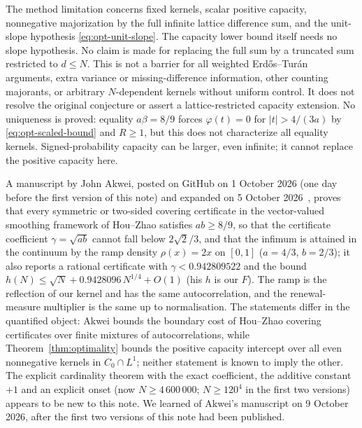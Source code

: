 \documentclass[10pt]{article}
\makeatletter
\numberwithin{equation}{section}
\theoremstyle{remark}
\renewcommand\subsection{\@startsection{subsection}{2}{\z@}{-2.2ex \@plus -.6ex \@minus -.2ex}{1ex \@plus .2ex}{\normalfont\normalsize\bfseries}}
\makeatother
\begin{document}
The method limitation concerns fixed kernels, scalar positive capacity,
nonnegative majorization by the full infinite lattice difference sum,
and the unit-slope hypothesis \eqref{eq:opt-unit-slope}. The capacity lower bound itself
needs no slope hypothesis. No claim is made for replacing the full sum
by a truncated sum restricted to $d\le N$. This is not a barrier for
all weighted Erd\H{o}s--Tur\'an arguments, extra variance or missing-difference
information, other counting majorants, or arbitrary $N$-dependent
kernels without uniform control. It does not resolve the original
conjecture or assert a lattice-restricted capacity extension.
No uniqueness is proved: equality $a\beta=8/9$ forces
$\varphi(t)=0$ for $|t|>4/(3a)$ by \eqref{eq:opt-scaled-bound}
and $R\ge1$, but this does not characterize all equality kernels.
Signed-probability capacity can be larger, even infinite; it cannot
replace the positive capacity here.

\subsection{Independent work on the same constant}\label{sec:akwei}
A manuscript by John Akwei, posted on GitHub on 1 October 2026 (one day
before the first version of this note) and expanded on 5 October
2026~\cite{Akw26a,Akw26b}, proves that every symmetric or two-sided
covering certificate in the vector-valued smoothing framework of
Hou--Zhao satisfies $ab\ge 8/9$, so that the certificate coefficient
$\gamma=\sqrt{ab}$ cannot fall below $2\sqrt2/3$, and that the infimum is
attained in the continuum by the ramp density $\rho(x)=2x$ on $[0,1]$
($a=4/3$, $b=2/3$); it also reports a rational certificate with
$\gamma<0.942809522$ and the bound $h(N)\le\sqrt N+0.9428096\,N^{1/4}+O(1)$
(his $h$ is our $F$).
The ramp is the reflection of our kernel and has the same
autocorrelation, and the renewal-measure multiplier is the same up to
normalisation. The statements differ in the quantified object: Akwei
bounds the boundary cost of Hou--Zhao covering certificates over finite
mixtures of autocorrelations, while Theorem~\ref{thm:optimality} bounds
the positive capacity intercept over all even nonnegative kernels in
$C_0\cap L^1$; neither statement is known to imply the other. The
explicit cardinality theorem with the exact coefficient, the additive
constant $+1$ and an explicit onset (now $N\ge4\,600\,000$; $N\ge120^4$ in
the first two versions) appears to be new to this note. We learned of
Akwei's manuscript on 9 October 2026, after the first two versions of
this note had been published.
\end{document}
